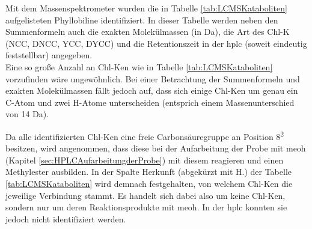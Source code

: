 Mit dem Massenspektrometer wurden die in Tabelle \ref{tab:LCMSKataboliten} aufgelisteten Phyllobiline identifiziert. In dieser Tabelle werden neben den Summenformeln auch die exakten Molekülmassen (in Da), die Art des \gls{Chl-K} (NCC, DNCC, YCC, DYCC) und die Retentionszeit in der \gls{hplc} (soweit eindeutig feststellbar) angegeben. \\

Eine so große Anzahl an \gls{Chl-K}en wie in Tabelle \ref{tab:LCMSKataboliten} vorzufinden wäre ungewöhnlich. Bei einer Betrachtung der Summenformeln und exakten Molekülmassen fällt jedoch auf, dass sich einige \gls{Chl-K}en um genau ein C-Atom und zwei H-Atome unterscheiden (entsprich einem Massenunterschied von 14 Da). 

Da alle identifizierten \gls{Chl-K}en eine freie Carbonsäuregruppe an Position 8\textsuperscript{2} besitzen, wird angenommen, dass diese bei der Aufarbeitung der Probe mit \gls{meoh} (Kapitel \ref{sec:HPLCAufarbeitungderProbe}) mit diesem reagieren und einen Methylester ausbilden. In der Spalte Herkunft (abgekürzt mit H.) der Tabelle \ref{tab:LCMSKataboliten} wird demnach festgehalten, von welchem \gls{Chl-K}en die jeweilige Verbindung stammt. Es handelt sich dabei also um keine \gls{Chl-K}en, sondern nur um deren Reaktionsprodukte mit \gls{meoh}. In der \gls{hplc} konnten sie jedoch nicht identifiziert werden. \\

